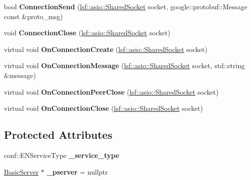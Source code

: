 \begin{DoxyCompactItemize}
\item 
\hypertarget{classBasicService_a541576aa64f28891945b23eee760bea3}{
bool {\bfseries ConnectionSend} (\hyperlink{classlsf_1_1asio_1_1SharedSocket}{lsf::asio::SharedSocket} socket, google::protobuf::Message const \&proto\_\-msg)}
\label{classBasicService_a541576aa64f28891945b23eee760bea3}

\item 
\hypertarget{classBasicService_a867144f4c41fae7e87707f4e88fc5b21}{
void {\bfseries ConnectionClose} (\hyperlink{classlsf_1_1asio_1_1SharedSocket}{lsf::asio::SharedSocket} socket)}
\label{classBasicService_a867144f4c41fae7e87707f4e88fc5b21}

\item 
\hypertarget{classBasicService_a41338e2489071947a2a1b92d618f979f}{
virtual void {\bfseries OnConnectionCreate} (\hyperlink{classlsf_1_1asio_1_1SharedSocket}{lsf::asio::SharedSocket} socket)}
\label{classBasicService_a41338e2489071947a2a1b92d618f979f}

\item 
\hypertarget{classBasicService_aa742339ba81b9d1b7773f00591a5e55f}{
virtual void {\bfseries OnConnectionMessage} (\hyperlink{classlsf_1_1asio_1_1SharedSocket}{lsf::asio::SharedSocket} socket, std::string \&message)}
\label{classBasicService_aa742339ba81b9d1b7773f00591a5e55f}

\item 
\hypertarget{classBasicService_a31821fe712a985ed7c216f57c9ecaf67}{
virtual void {\bfseries OnConnectionPeerClose} (\hyperlink{classlsf_1_1asio_1_1SharedSocket}{lsf::asio::SharedSocket} socket)}
\label{classBasicService_a31821fe712a985ed7c216f57c9ecaf67}

\item 
\hypertarget{classBasicService_af6ae57c41a1954bda6f2e94f6c74b57e}{
virtual void {\bfseries OnConnectionClose} (\hyperlink{classlsf_1_1asio_1_1SharedSocket}{lsf::asio::SharedSocket} socket)}
\label{classBasicService_af6ae57c41a1954bda6f2e94f6c74b57e}

\end{DoxyCompactItemize}
\subsection*{Protected Attributes}
\begin{DoxyCompactItemize}
\item 
\hypertarget{classBasicService_a4eb5b8ce2a260decf65de194ce710aa0}{
conf::ENServiceType {\bfseries \_\-service\_\-type}}
\label{classBasicService_a4eb5b8ce2a260decf65de194ce710aa0}

\item 
\hypertarget{classBasicService_ac1b3163d04f30a58a3c9703747b0279d}{
\hyperlink{classBasicServer}{BasicServer} $\ast$ {\bfseries \_\-pserver} = nullptr}
\label{classBasicService_ac1b3163d04f30a58a3c9703747b0279d}

\end{DoxyCompactItemize}
